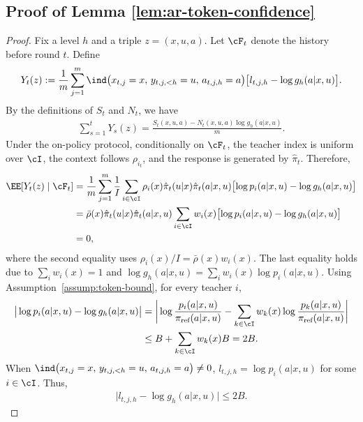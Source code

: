 \documentclass[11pt]{article}
\newcommand{\piref}{\pi_{\text{ref}}}
\begin{document}
\subsection{Proof of Lemma \ref{lem:ar-token-confidence}}
 \begin{proof}
Fix a level $h$ and a triple $z=(x,u,a)$.
Let $\cF_t$ denote the history before round $t$. Define
\begin{align*}
    Y_t(z)
    :=
    \frac1m
    \sum_{j=1}^m
    \ind\bigl(
        x_{t,j}=x,\,
        y_{t,j,<h}=u,\,
        a_{t,j,h}=a
    \bigr)
    \bigl[
        l_{t,j,h}-\log g_h(a|x,u)
    \bigr].
\end{align*}
By the definitions of $S_t$ and $N_t$, we have
\begin{align}
    \sum_{s=1}^t Y_s(z)
    =
    \frac{
        S_t(x,u,a)
        -
        N_t(x,u,a)\log g_h(a|x,u)
    }{m}.
    \label{eq:confidence-centered-sum}
\end{align}
Under the on-policy protocol, conditionally on $\cF_t$, the teacher index is uniform over $\cI$, the context follows $\rho_{i_t}$, and the response is generated by $\hat\pi_t$. Therefore,
\begin{align*}
    \EE[Y_t(z)\mid\cF_t]
    &=
    \frac1m\sum_{j=1}^m
    \frac1I\sum_{i\in\cI}
    \rho_i(x)\hat\pi_t(u|x)\hat\pi_t(a|x,u)
    \bigl[
        \log p_i(a|x,u)-\log g_h(a|x,u)
    \bigr]\\
    &=
    \bar\rho(x)\hat\pi_t(u|x)\hat\pi_t(a|x,u)
    \sum_{i\in\cI}w_i(x)
    \bigl[
        \log p_i(a|x,u)-\log g_h(a|x,u)
    \bigr]\\
    &=0,
\end{align*}
where the second equality uses $\rho_i(x)/I=\bar\rho(x)w_i(x)$. The last equality holds due to $\sum_iw_i(x)=1$ and $\log g_h(a|x,u)=\sum_iw_i(x)\log p_i(a|x,u)$. 
Using Assumption~\ref{assump:token-bound}, for every teacher $i$,
\begin{align*}
    \big|
        \log p_i(a|x,u)-\log g_h(a|x,u)
    \big|
    &=
    \bigg|
        \log\frac{p_i(a|x,u)}{\piref(a|x,u)}
        -
        \sum_{k\in\cI}w_k(x)
        \log\frac{p_k(a|x,u)}{\piref(a|x,u)}
    \bigg|\\
    &\leq
    B+\sum_{k\in\cI}w_k(x)B
    =2B.
\end{align*}
When $\ind\bigl(x_{t,j}=x,\,y_{t,j,<h}=u,\,a_{t,j,h}=a\bigr) \neq 0$, $l_{t,j,h}=\log p_i(a|x,u)$ for some $i\in \cI$. Thus, 
\begin{align*}
    \big|l_{t,j,h}-\log g_h(a|x,u)\big| \le 2B.
\end{align*}

\end{proof}
\end{document}
